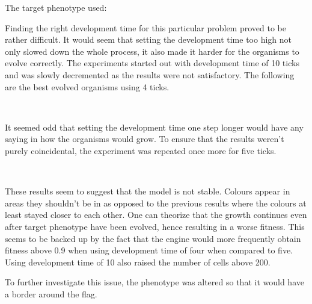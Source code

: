 The target phenotype used:

\begin{center}\end{center}

Finding the right development time for this particular problem proved to be rather difficult. It would seem that setting the development time too high not only slowed down the whole process, it also made it harder for the organisms to evolve correctly. The experiments started out with development time of 10 ticks and was slowly decremented as the results were not satisfactory. The following are the best evolved organisms using 4 ticks.

\begin{center}
	~
	~
\end{center}

It seemed odd that setting the development time one step longer would have any saying in how the organisms would grow. To ensure that the results weren't purely coincidental, the experiment was repeated once more for five ticks.

\begin{center}
	~
	~
\end{center}

These results seem to suggest that the model is not stable. Colours appear in areas they shouldn't be in as opposed to the previous results where the colours at least stayed closer to each other. One can theorize that the growth continues even after target phenotype have been evolved, hence resulting in a worse fitness. This seems to be backed up by the fact that the engine would more frequently obtain fitness above 0.9 when using development time of four when compared to five. Using development time of 10 also raised the number of cells above 200.

To further investigate this issue, the phenotype was altered so that it would have a border around the flag.

\begin{center}\end{center}

